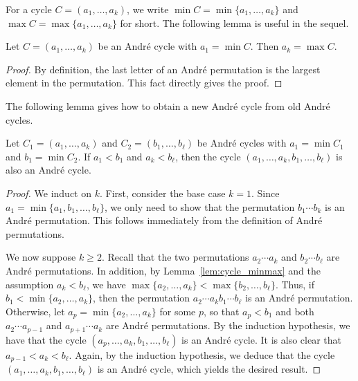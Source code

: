 For a cycle \( C=(a_1,\dots,a_k) \), we write \( \min C = \min \{a_1,\dots,a_k\} \)
and \( \max C = \max \{a_1,\dots,a_k\}\) for short.
The following lemma is useful in the sequel.
\begin{lem} \label{lem:cycle_minmax}
  Let \( C=(a_1,\dots,a_k) \) be an Andr\'e cycle with \( a_1=\min C \).
  Then \( a_k=\max C \).
\end{lem}
\begin{proof}
  By definition, the last letter of an Andr\'e permutation is the largest element
  in the permutation. This fact directly gives the proof.
\end{proof}
The following lemma gives how to obtain a new Andr\'e cycle from old Andr\'e cycles.
\begin{lem} \label{lem:merging}
  Let \( C_1=(a_1,\dots,a_k) \) and \( C_2=(b_1,\dots,b_\ell) \) be Andr\'e cycles with
  \( a_1 = \min C_1 \) and \( b_1=\min C_2 \).
  If \( a_1<b_1 \) and \( a_k<b_\ell \), then the cycle \( (a_1,\dots,a_k, b_1,\dots,b_\ell) \) is also an Andr\'e cycle.
\end{lem}
\begin{proof}
  We induct on \( k \). First, consider the base case \( k=1 \).
  Since \( a_1 = \min\{a_1,b_1,\dots,b_\ell\} \), we only need to show that the
  permutation \( b_1\cdots b_k \) is an Andr\'e permutation.
  This follows immediately from the definition of Andr\'e permutations.
  
  We now suppose \( k\ge 2 \).
  Recall that the two permutations \( a_2\cdots a_k \) and \( b_2\cdots b_\ell \)
  are Andr\'e permutations. In addition, by Lemma~\ref{lem:cycle_minmax} and
  the assumption \( a_k< b_\ell \),
  we have \( \max\{a_2,\dots,a_k\}<\max\{b_2,\dots,b_\ell\} \).
  Thus, if \( b_1< \min\{a_2,\dots,a_k\} \),
  then the permutation \( a_2\cdots a_k b_1\cdots b_\ell \) is an Andr\'e permutation.
  Otherwise, let \( a_p=\min\{a_2,\dots,a_k\} \) for some \( p \), so that \( a_p < b_1 \)
  and both \( a_2\cdots a_{p-1} \) and \( a_{p+1}\cdots a_k \) are Andr\'e permutations.
  By the induction hypothesis, we have that
  the cycle \( (a_p,\dots,a_k,b_1,\dots,b_\ell) \) is an Andr\'e cycle.
  It is also clear that \( a_{p-1} < a_k < b_\ell \).
  Again, by the induction hypothesis,
  we deduce that the cycle \( (a_1,\dots,a_k, b_1,\dots,b_\ell) \) is an Andr\'e cycle, which yields the desired result.
\end{proof}

